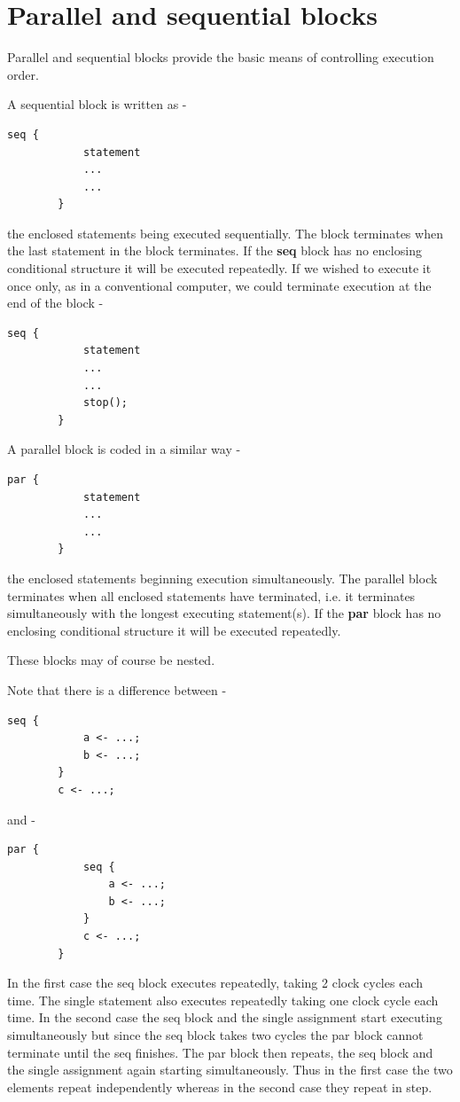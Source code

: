 \documentclass[10pt,a4paper,twoside,fleqn]{article}
\newcommand{\kwd}[1]{{\bf #1}} %
\begin{document}
   
\section{Parallel and sequential blocks}

    Parallel and sequential blocks provide the basic means of controlling execution
    order.
    
    A sequential block is written as -
    \begin{lstlisting}[language=threepl]
        seq {
            statement
            ...
            ...
        }
    \end{lstlisting}
    the enclosed statements being executed sequentially. The block terminates when
    the last statement in the block terminates.
    If the \kwd{seq} block
    has no enclosing conditional structure it will be executed repeatedly. If we
    wished to execute it once only, as in a conventional computer, we could
    terminate execution at the end of the block -
    \begin{lstlisting}[language=threepl]
        seq {
            statement
            ...
            ...
            stop();
        }
    \end{lstlisting}
    
    A parallel block is coded in a similar way -
    \begin{lstlisting}[language=threepl]
        par {
            statement
            ...
            ...
        }
    \end{lstlisting}
    the enclosed statements beginning execution simultaneously.
    The parallel block terminates when all enclosed statements have terminated, i.e.
    it terminates simultaneously with the longest executing statement(s).
    If the \kwd{par} block
    has no enclosing conditional structure it will be executed repeatedly.    

    These blocks may of course be nested.
    
    Note that there is a difference between -
    \begin{lstlisting}[language=threepl]
        seq {
            a <- ...;
            b <- ...;
        }
        c <- ...;
    \end{lstlisting}
    and -
    \begin{lstlisting}[language=threepl]
        par {
            seq {
                a <- ...;
                b <- ...;
            }
            c <- ...;
        }
    \end{lstlisting}
    In the first case the seq block executes repeatedly, taking 2 clock
    cycles each time. The single statement also executes repeatedly taking
    one clock cycle each time. In the second case the seq block and the
    single assignment start executing simultaneously but since the seq block
    takes two cycles the par block cannot terminate until the seq finishes.
    The par block then repeats, the seq block and the single assignment
    again starting simultaneously. Thus in the first case the two elements repeat
    independently whereas in the second case they repeat in step.
\end{document}
